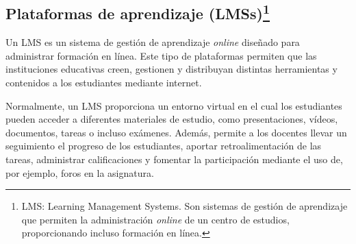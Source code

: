 \subsection[Plataformas de aprendizaje (LMSs)]{Plataformas de aprendizaje (LMSs)\footnote{LMS: Learning Management Systems. Son sistemas de gestión de aprendizaje que permiten la administración \textit{online} de un centro de estudios, proporcionando incluso formación en línea. }}
Un LMS es un sistema de gestión de aprendizaje \textit{online} diseñado para administrar formación en línea.
Este tipo de plataformas permiten que las instituciones educativas creen, gestionen y distribuyan distintas herramientas y contenidos a los estudiantes mediante internet.

Normalmente, un LMS proporciona un entorno virtual en el cual los estudiantes pueden acceder a diferentes materiales de estudio, como presentaciones, vídeos, documentos, tareas o incluso exámenes.
Además, permite a los docentes llevar un seguimiento el progreso de los estudiantes, aportar retroalimentación de las tareas, administrar calificaciones y fomentar la participación mediante el uso de, por ejemplo, foros en la asignatura.

